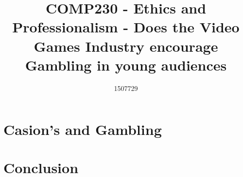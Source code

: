 \documentclass{scrartcl}
\title{COMP230 - Ethics and Professionalism - Does the Video Games Industry encourage Gambling in young audiences}
\author{1507729}
\begin{document}
\maketitle

\section{Casion's and Gambling}

\section{Conclusion}





\end{document}
